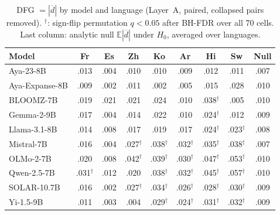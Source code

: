 \begin{table}[t]
\centering
\small
\caption{DFG $=|\overline{d}|$ by model and language (Layer~A, paired, collapsed pairs removed). $^{\dagger}$: sign-flip permutation $q<0.05$ after BH-FDR over all 70 cells. Last column: analytic null $\mathbb{E}|\overline{d}|$ under $H_0$, averaged over languages.}
\label{tab:dfg_full}
\begin{tabular}{lcccccccc}
\toprule
\textbf{Model} & \textbf{Fr} & \textbf{Es} & \textbf{Zh} & \textbf{Ko} & \textbf{Ar} & \textbf{Hi} & \textbf{Sw} & \textbf{Null} \\
\midrule
Aya-23-8B & .013 & .004 & .010 & .010 & .009 & .012 & .011 & .007 \\
Aya-Expanse-8B & .009 & .002 & .011 & .002 & .005 & .015 & .028 & .010 \\
BLOOMZ-7B & .019 & .021 & .021 & .024 & .010 & .038$^{\dagger}$ & .005 & .010 \\
Gemma-2-9B & .017 & .004 & .014 & .022 & .010 & .024$^{\dagger}$ & .012 & .009 \\
Llama-3.1-8B & .014 & .008 & .017 & .019 & .017 & .024$^{\dagger}$ & .023$^{\dagger}$ & .008 \\
Mistral-7B & .016 & .004 & .027$^{\dagger}$ & .038$^{\dagger}$ & .032$^{\dagger}$ & .035$^{\dagger}$ & .038$^{\dagger}$ & .007 \\
OLMo-2-7B & .020 & .008 & .042$^{\dagger}$ & .039$^{\dagger}$ & .030$^{\dagger}$ & .047$^{\dagger}$ & .053$^{\dagger}$ & .010 \\
Qwen-2.5-7B & .031$^{\dagger}$ & .012 & .020 & .038$^{\dagger}$ & .032$^{\dagger}$ & .045$^{\dagger}$ & .057$^{\dagger}$ & .010 \\
SOLAR-10.7B & .016 & .002 & .027$^{\dagger}$ & .034$^{\dagger}$ & .026$^{\dagger}$ & .028$^{\dagger}$ & .030$^{\dagger}$ & .009 \\
Yi-1.5-9B & .011 & .003 & .004 & .029$^{\dagger}$ & .024$^{\dagger}$ & .031$^{\dagger}$ & .032$^{\dagger}$ & .009 \\
\bottomrule
\end{tabular}
\end{table}
